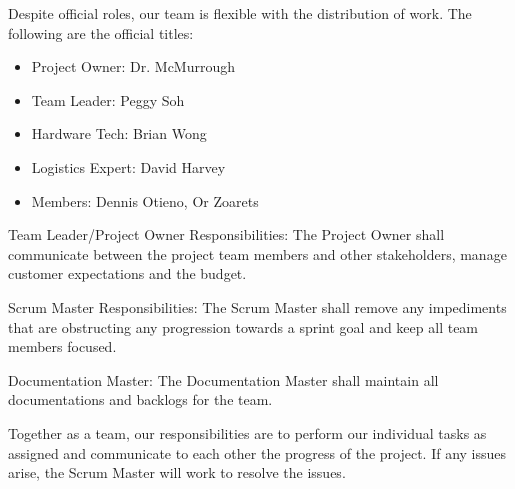 Despite official roles, our team is flexible with the distribution of work. The following are the official titles:
\begin{itemize}
	\item Project Owner: Dr. McMurrough
	\item Team Leader: Peggy Soh
	\item Hardware Tech: Brian Wong
	\item Logistics Expert: David Harvey
	\item Members: Dennis Otieno, Or Zoarets
\end{itemize}
Team Leader/Project Owner Responsibilities: The Project Owner shall communicate between the project team members and other stakeholders, manage customer expectations and the budget.

Scrum Master Responsibilities: The Scrum Master shall remove any impediments that are obstructing any progression towards a sprint goal and keep all team members focused.

Documentation Master: The Documentation Master shall maintain all documentations and backlogs for the team.

Together as a team, our responsibilities are to perform our individual tasks as assigned and communicate to each other the progress of the project. If any issues arise, the Scrum Master will work to resolve the issues. 
